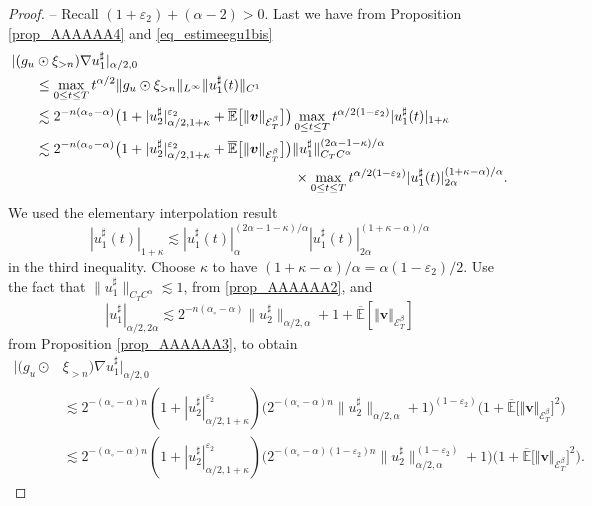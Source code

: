 \documentclass[10pt]{amsart}
\theoremstyle{definition}
\let\epsilon\varepsilon
\newcommand\bbE{\mathbb{E}}
\newcommand{\mcE}{\mathcal{E}}
\newcommand{\bsv}{\boldsymbol{v}}
\newcommand{\norme}[1]{\Vert #1 \Vert}
\begin{document}
\begin{proof}
-- Recall $(1 + \epsilon_2) + (\alpha - 2) > 0$. Last we have from Proposition \ref{prop_AAAAAA4} and \eqref{eq_estimeegu1bis}
\begin{align*}
| (g_u &\odot \xi_{> n}) \nabla u_1^{\sharp} |_{\alpha / 2, 0} \\
&\leq
\max_{0 \leq t \leq T} t^{\alpha / 2} \| g_u \odot \xi_{> n}
\|_{L^{\infty}} \| {u_1^{\sharp}} (t) \|_{C^1}
\\
& \lesssim 2^{- n (\alpha_{\circ} - \alpha)} \bigl(1 + | u_2^{\sharp}
|^{\epsilon_2}_{\alpha / 2, 1 + \kappa} + \overline{\bbE}\bigl[\norme{\bsv}_{\mcE^\beta_T}\bigr] \bigr) \max_{0 \leq t \leq T} t^{\alpha
/ 2 (1 - \epsilon_2)} | {u_1^{\sharp}} (t) |_{1 + \kappa}
\\
& \lesssim 2^{- n (\alpha_{\circ} - \alpha)} \bigl( 1 + | u_2^{\sharp}
|^{\epsilon_2}_{\alpha / 2, 1 + \kappa} + \overline{\bbE}\bigl[\norme{\bsv}_{\mcE^\beta_T}\bigr] \bigr) \| {u_1^{\sharp}}
\|_{C_T C^{\alpha}}^{(2 \alpha - 1 - \kappa) / \alpha}
\\
&\hspace{6.5cm} \times \max_{0 \leq
t \leq T} t^{{\alpha / 2 (1 - \epsilon_2)}} |
{u_1^{\sharp}} (t) |^{(1 + \kappa - \alpha) / \alpha}_{2 \alpha}.
\end{align*}
We used the elementary interpolation result
\[
| {u_1^{\sharp}} (t) |_{1 + \kappa} \lesssim |
{u_1^{\sharp}} (t) |^{(2 \alpha - 1 - \kappa) / \alpha}_{\alpha}
| {u_1^{\sharp}} (t) |^{(1 + \kappa - \alpha) / \alpha}_{ 2
\alpha}
\]
in the third inequality. Choose $\kappa$ to have $(1 + \kappa
- \alpha) / \alpha = \alpha (1 - \epsilon_2) / 2$. Use the fact that $\|
u_1^{\sharp} \|_{C_T C^{\alpha}} \lesssim 1$, from \ref{prop_AAAAAA2}, and
\[
| u_1^{\sharp}|_{\alpha / 2, 2 \alpha} \lesssim 2^{- n (\alpha_{\circ} - \alpha)} \| u_2^{\sharp} \|_{\alpha / 2, \alpha} + 1 + \overline{\bbE}[\norme{\bsv}_{\mcE^\beta_T}]
\]
from Proposition \ref{prop_AAAAAA3}, to obtain
\begin{align*}
| (g_u \odot &\xi_{> n}) \nabla u_1^{\sharp} |_{\alpha / 2, 0}
\\
& \lesssim
2^{- (\alpha_{\circ} - \alpha) n} (1 + | u_2^{\sharp}
|^{\epsilon_2}_{\alpha / 2, 1 + \kappa}) \bigl(2^{- (\alpha_{\circ} - \alpha) n} \| u_2^{\sharp} \|_{\alpha / 2, \alpha} + 1\bigr)^{(1 - \epsilon_2)}\bigl(1+\overline{\bbE}\bigl[\norme{\bsv}_{\mcE^\beta_T}\bigr]^2\bigr)
\\
&\lesssim 2^{- (\alpha_{\circ} - \alpha) n} (1 + | u_2^{\sharp}
|^{\epsilon_2}_{\alpha / 2, 1 + \kappa}) \bigl(2^{- (\alpha_{\circ} - \alpha)
(1 - \epsilon_2) n} \| u_2^{\sharp} \|^{{(1 - \epsilon_2)}}_{\alpha / 2, \alpha} + 1\bigr)\bigl(1+\overline{\bbE}\bigl[\norme{\bsv}_{\mcE^\beta_T}\bigr]^2\bigr).
\end{align*}


\end{proof}
\end{document}
